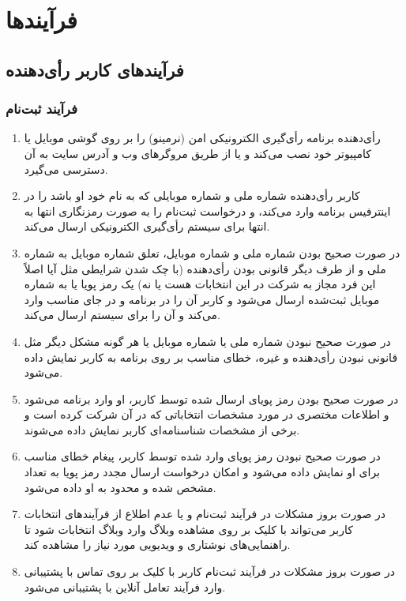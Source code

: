 \documentclass[12pt]{article}
\begin{document}
\section{فرآیندها}


\subsection{فرآیندهای کاربر رأی‌دهنده}


\subsubsection{فرآیند ثبت‌نام}
\begin{enumerate}[label=(\arabic*)]
\item
رأی‌دهنده برنامه رأی‌گیری الکترونیکی امن (نرمینو) را بر روی گوشی موبایل یا کامپیوتر خود نصب می‌کند و یا از طریق مروگرهای وب  و آدرس سایت به آن دسترسی می‌گیرد.
\item
کاربر رأی‌دهنده شماره ملی و شماره موبایلی که به نام خود او باشد را در اینترفیس  
برنامه وارد می‌کند، و درخواست ثبت‌نام را به صورت رمزنگاری انتها به انتها%
برای سیستم رأی‌گیری الکترونیکی ارسال می‌کند. 
\item
در صورت صحیح بودن شماره ملی و شماره موبایل، تعلق شماره موبایل به شماره ملی و از طرف دیگر قانونی بودن رأی‌دهنده (با چک شدن شرایطی مثل آیا اصلاً این فرد مجاز به شرکت در این انتخابات هست یا نه)  یک رمز پویا یا 
به شماره موبایل ثبت‌شده ارسال می‌شود و کاربر آن را در برنامه و در جای مناسب وارد می‌کند و آن را برای سیستم ارسال می‌کند. 
\item
در صورت صحیح نبودن شماره ملی یا شماره موبایل یا هر گونه مشکل دیگر مثل قانونی نبودن رأی‌دهنده و غیره، خطای مناسب بر روی برنامه به کاربر نمایش داده می‌شود. 
\item
در صورت صحیح بودن رمز پویای ارسال شده توسط کاربر، او وارد برنامه می‌شود و اطلاعات مختصری در مورد مشخصات انتخاباتی که در آن شرکت کرده است و برخی از مشخصات شناسنامه‌ای کاربر نمایش داده می‌شوند. 
\item
در صورت صحیح نبودن رمز پویای وارد شده توسط کاربر، پیغام خطای مناسب برای او نمایش داده می‌شود و امکان درخواست ارسال مجدد رمز پویا به تعداد مشخص شده و محدود به او داده می‌شود. 
\item
در صورت بروز مشکلات در فرآیند ثبت‌نام و یا عدم اطلاع از فرآیندهای انتخابات کاربر می‌تواند با کلیک بر روی مشاهده وبلاگ وارد وبلاگ انتخابات شود تا راهنمایی‌های نوشتاری و ویدیویی مورد نیاز را مشاهده کند. 
\item
در صورت بروز مشکلات در فرآیند ثبت‌نام کاربر با کلیک بر روی تماس با پشتیبانی وارد فرآیند تعامل آنلاین با پشتیبانی می‌شود.
\end{enumerate}
\end{document}
